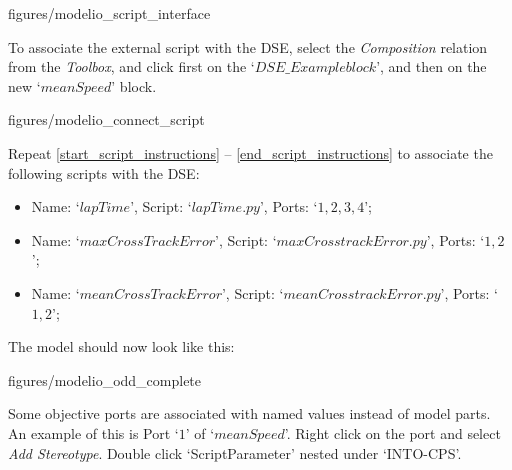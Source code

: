 \documentclass[11pt,a4paper]{../tutorial}
\begin{document}
\begin{instructions}
\begin{center}
\begin{annotation}[width=0.7\linewidth]{figures/modelio_script_interface}
    \end{annotation}
\end{center}


\item \label{end_script_instructions}To associate the external script with the DSE, select the \emph{Composition} relation from the \emph{Toolbox}, and click first on the `$DSE\_Example block$', and then on the new `$meanSpeed$' block.

\begin{center}
\begin{annotation}[width=0.7\linewidth]{figures/modelio_connect_script}
    \end{annotation}
\end{center}

\newpage

\item Repeat \ref{start_script_instructions} -- \ref{end_script_instructions} to associate the following scripts with the DSE:
\begin{itemize}
	\item Name: `$lapTime$', Script: `$lapTime.py$', Ports: `$1,2,3,4$';
	\item Name: `$maxCrossTrackError$', Script: `$maxCrosstrackError.py$', Ports: `$1,2$';
	\item Name: `$meanCrossTrackError$', Script: `$meanCrosstrackError.py$', Ports: `$1,2$';
\end{itemize}

The model should now look like this:

\begin{center}
\begin{annotation}[width=0.7\linewidth]{figures/modelio_odd_complete}
    \end{annotation}
\end{center}

\newpage

\item \label{start_values_instructions} Some objective ports are associated with named values instead of model parts. An example of this is Port `$1$' of `$meanSpeed$'. Right click on the port and select \emph{Add Stereotype}. Double click `ScriptParameter' nested under `INTO-CPS'.


\end{instructions}
\end{document}
